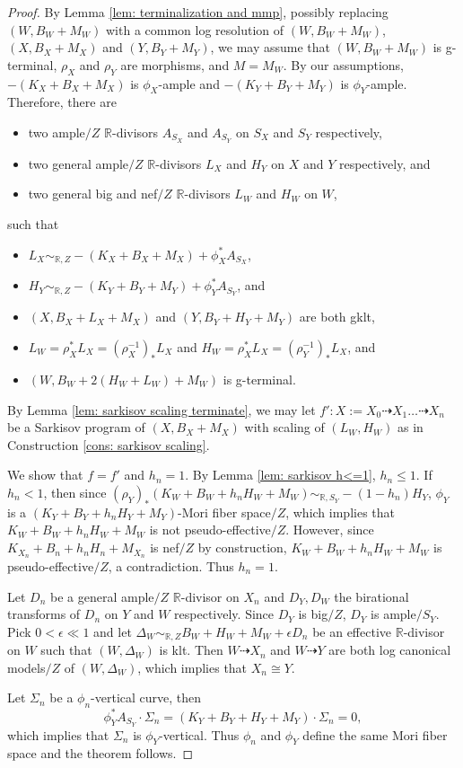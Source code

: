 \documentclass[11pt]{amsart}
\numberwithin{equation}{section}
\newcommand{\Rr}{\mathbb{R}}
\theoremstyle{definition}
\theoremstyle{remark}
\theoremstyle{definition}
\begin{document}
\begin{proof}
By Lemma \ref{lem: terminalization and mmp}, possibly replacing $(W,B_W+M_W)$ with a common log resolution of $(W,B_W+M_W)$, $(X,B_X+M_X)$ and $(Y,B_Y+M_Y)$, we may assume that $(W,B_W+M_W)$ is g-terminal, $\rho_X$ and $\rho_Y$ are morphisms, and $M=M_W$. By our assumptions, $-(K_X+B_X+M_X)$ is $\phi_X$-ample and $-(K_Y+B_Y+M_Y)$ is $\phi_Y$-ample. Therefore, there are
\begin{itemize}
    \item two ample$/Z$ $\Rr$-divisors $A_{S_X}$ and $A_{S_Y}$ on $S_X$ and $S_Y$ respectively, 
    \item two general ample$/Z$ $\Rr$-divisors $L_X$ and $H_Y$ on $X$ and $Y$ respectively, and
    \item two general big and nef$/Z$ $\Rr$-divisors $L_W$ and $H_W$ on $W$,
\end{itemize}
such that
\begin{itemize}
    \item $L_X\sim_{\Rr,Z}-(K_X+B_X+M_X)+\phi_X^*A_{S_X}$,
    \item $H_Y\sim_{\Rr,Z}-(K_Y+B_Y+M_Y)+\phi_Y^*A_{S_Y}$, and
    \item $(X,B_X+L_X+M_X)$ and $(Y,B_Y+H_Y+M_Y)$ are both gklt,
    \item $L_W=\rho_X^*L_X=(\rho_X^{-1})_*L_X$ and $H_W=\rho_X^*L_X=(\rho_Y^{-1})_*L_X$, and
    \item $(W,B_W+2(H_W+L_W)+M_W)$ is g-terminal.
\end{itemize}
By Lemma \ref{lem: sarkisov scaling terminate}, we may let $f': X:=X_0\dashrightarrow X_1\dots\dashrightarrow X_n$ be a Sarkisov program of $(X,B_X+M_X)$ with scaling of $(L_W,H_W)$ as in Construction \ref{cons: sarkisov scaling}. 

We show that $f=f'$ and $h_n=1$. By Lemma \ref{lem: sarkisov h<=1}, $h_n\leq 1$. If $h_n<1$, then since $(\rho_Y)_*(K_W+B_W+h_nH_W+M_W)\sim_{\Rr,S_Y}-(1-h_n)H_Y$, $\phi_Y$ is a $(K_Y+B_Y+h_nH_Y+M_Y)$-Mori fiber space$/Z$, which implies that $K_W+B_W+h_nH_W+M_W$ is not pseudo-effective$/Z$. However, since $K_{X_n}+B_{n}+h_nH_{n}+M_{X_n}$ is nef$/Z$ by construction, $K_W+B_W+h_nH_W+M_W$ is pseudo-effective$/Z$, a contradiction. Thus $h_n=1$.

Let $D_n$ be a general ample$/Z$ $\Rr$-divisor on $X_n$ and $D_Y,D_W$ the birational transforms of $D_n$ on $Y$ and $W$ respectively. Since $D_Y$ is big$/Z$, $D_Y$ is ample$/S_Y$. Pick $0<\epsilon\ll 1$ and let $\Delta_W\sim_{\Rr,Z}B_W+H_W+M_W+\epsilon D_n$ be an effective $\Rr$-divisor on $W$ such that $(W,\Delta_W)$ is klt. Then $W\dashrightarrow X_n$ and $W\dashrightarrow Y$ are both log canonical models$/Z$ of $(W,\Delta_W)$, which implies that $X_n\cong Y$.

Let $\Sigma_n$ be a $\phi_n$-vertical curve, then 
$$\phi_Y^*A_{S_Y}\cdot\Sigma_n=(K_{Y}+B_{Y}+H_{Y}+M_{Y})\cdot\Sigma_n=0,$$
which implies that $\Sigma_n$ is $\phi_Y$-vertical. Thus $\phi_n$ and $\phi_Y$ define the same Mori fiber space and the theorem follows.
\end{proof}
\end{document}
